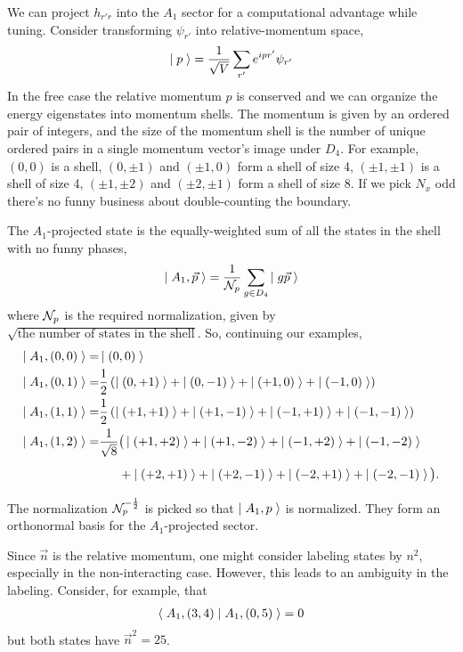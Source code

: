 We can project $h_{r'r}$ into the $A_1$ sector for a computational advantage while tuning.
Consider transforming $\psi_{r'}$ into relative-momentum space,
\begin{align}
    \left|\;p\;\right\rangle = \frac{1}{\sqrt{V}}\sum_{r'} e^{ipr'} \psi_{r'}
\end{align}
In the free case the relative momentum $p$ is conserved and we can organize the energy eigenstates into momentum shells.
The momentum is given by an ordered pair of integers, and the size of the momentum shell is the number of unique ordered pairs in a single momentum vector's image under $D_4$.
For example, $(0,0)$ is a shell, $(0,\pm 1)$ and $(\pm 1, 0)$ form a shell of size 4, $(\pm 1, \pm 1)$ is a shell of size 4, $(\pm 1, \pm 2)$ and $(\pm 2, \pm 1)$ form a shell of size 8.
If we pick $N_x$ odd there's no funny business about double-counting the boundary.

The $A_1$-projected state is the equally-weighted sum of all the states in the shell with no funny phases,
\begin{align}
    \left|\;A_1, \vec{p}\;\right\rangle = \frac{1}{\mathcal{N}_{p}} \sum_{g\in D_4} \left|\;g\vec{p}\;\right\rangle
\end{align}
where $\mathcal{N}_{p}$ is the required normalization, given by $\sqrt{\textrm{the number of states in the shell}}$.
So, continuing our examples,
\begin{align}
    \ket{A_1, (0,0)} =& \ket{(0,0)}
    \\
    \ket{A_1, (0,1)} =& \frac{1}{2}\left(\ket{(0,+1)} + \ket{(0,-1)} + \ket{(+1,0)} + \ket{(-1,0)} \right)
    \\
    \ket{A_1, (1,1)} =& \frac{1}{2}\left(\ket{(+1,+1)} + \ket{(+1,-1)} + \ket{(-1,+1)} + \ket{(-1,-1)} \right)
    \\
    \ket{A_1, (1,2)} =& \frac{1}{\sqrt{8}}\big(\ket{(+1,+2)} + \ket{(+1,-2)} + \ket{(-1,+2)} + \ket{(-1,-2)} \nonumber\\
                     &\phantom{\frac{1}{\sqrt{8}}}+ \ket{(+2,+1)} + \ket{(+2,-1)} + \ket{(-2,+1)} + \ket{(-2,-1)} \big).
\end{align}
The normalization $\mathcal{N}_{p}^{-\frac{1}{2}}$ is picked so that $\left|\;A_1, p\;\right\rangle$ is normalized.
They form an orthonormal basis for the $A_1$-projected sector.

Since $\vec{n}$ is the relative momentum, one might consider labeling states by $n^2$, especially in the non-interacting case.
However, this leads to an ambiguity in the labeling.
Consider, for example, that
\begin{align}
    \left\langle\;A_1, (3,4)\;\middle|\;A_1, (0,5)\;\right\rangle = 0
\end{align}
but both states have $\vec{n}^2=25$.

